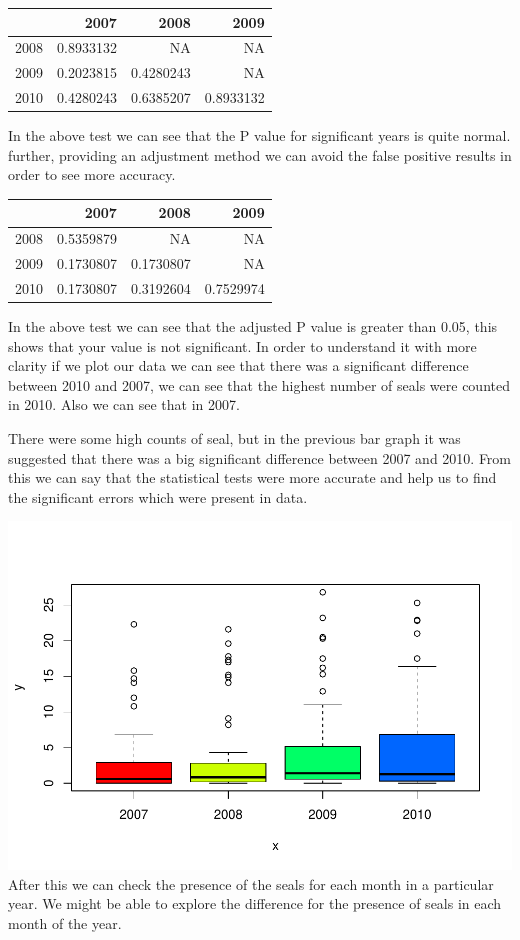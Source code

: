 \documentclass[
]{article}
\begin{document}
\begin{longtable}[]{@{}lrrr@{}}
\toprule
& 2007 & 2008 & 2009\tabularnewline
\midrule
\endhead
2008 & 0.8933132 & NA & NA\tabularnewline
2009 & 0.2023815 & 0.4280243 & NA\tabularnewline
2010 & 0.4280243 & 0.6385207 & 0.8933132\tabularnewline
\bottomrule
\end{longtable}

In the above test we can see that the P value for significant years is
quite normal. further, providing an adjustment method we can avoid the
false positive results in order to see more accuracy.

\begin{longtable}[]{@{}lrrr@{}}
\toprule
& 2007 & 2008 & 2009\tabularnewline
\midrule
\endhead
2008 & 0.5359879 & NA & NA\tabularnewline
2009 & 0.1730807 & 0.1730807 & NA\tabularnewline
2010 & 0.1730807 & 0.3192604 & 0.7529974\tabularnewline
\bottomrule
\end{longtable}

In the above test we can see that the adjusted P value is greater than
0.05, this shows that your value is not significant. In order to
understand it with more clarity if we plot our data we can see that
there was a significant difference between 2010 and 2007, we can see
that the highest number of seals were counted in 2010. Also we can see
that in 2007.

There were some high counts of seal, but in the previous bar graph it
was suggested that there was a big significant difference between 2007
and 2010. From this we can say that the statistical tests were more
accurate and help us to find the significant errors which were present
in data.

\includegraphics{Statistical-analysis-in-RStudio_files/figure-latex/unnamed-chunk-9-1.pdf}
After this we can check the presence of the seals for each month in a
particular year. We might be able to explore the difference for the
presence of seals in each month of the year.
\end{document}
